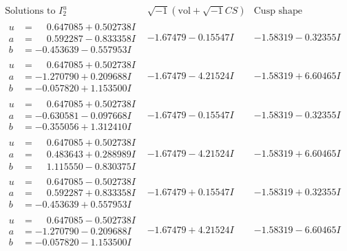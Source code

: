 \documentclass[1p]{elsarticle_modified}
\theoremstyle{definition}
\newcommand{\I}{\sqrt{-1}}
\begin{document}
$$\begin{array}{c|c|c}  
\text{Solutions to }I^u_{2}& \I (\text{vol} + \sqrt{-1}CS) & \text{Cusp shape}\\
 \hline 
\begin{aligned}
u &= \phantom{-}0.647085 + 0.502738 I \\
a &= \phantom{-}0.592287 - 0.833358 I \\
b &= -0.453639 - 0.557953 I\end{aligned}
 & -1.67479 - 0.15547 I & -1.58319 - 0.32355 I \\ \hline\begin{aligned}
u &= \phantom{-}0.647085 + 0.502738 I \\
a &= -1.270790 + 0.209688 I \\
b &= -0.057820 + 1.153500 I\end{aligned}
 & -1.67479 - 4.21524 I & -1.58319 + 6.60465 I \\ \hline\begin{aligned}
u &= \phantom{-}0.647085 + 0.502738 I \\
a &= -0.630581 - 0.097668 I \\
b &= -0.355056 + 1.312410 I\end{aligned}
 & -1.67479 - 0.15547 I & -1.58319 - 0.32355 I \\ \hline\begin{aligned}
u &= \phantom{-}0.647085 + 0.502738 I \\
a &= \phantom{-}0.483643 + 0.288989 I \\
b &= \phantom{-}1.115550 - 0.830375 I\end{aligned}
 & -1.67479 - 4.21524 I & -1.58319 + 6.60465 I \\ \hline\begin{aligned}
u &= \phantom{-}0.647085 - 0.502738 I \\
a &= \phantom{-}0.592287 + 0.833358 I \\
b &= -0.453639 + 0.557953 I\end{aligned}
 & -1.67479 + 0.15547 I & -1.58319 + 0.32355 I \\ \hline\begin{aligned}
u &= \phantom{-}0.647085 - 0.502738 I \\
a &= -1.270790 - 0.209688 I \\
b &= -0.057820 - 1.153500 I\end{aligned}
 & -1.67479 + 4.21524 I & -1.58319 - 6.60465 I \\ \hline\begin{aligned}

\end{aligned}
\end{array}$$
\end{document}
